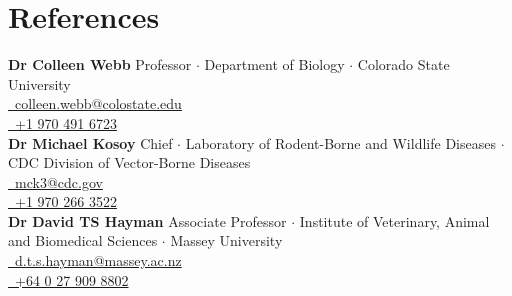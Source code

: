 \documentclass[letterpaper]{deedy-resume} %
\begin{document}

\section{References}
\textbf{Dr Colleen Webb} Professor $\cdot$ Department of Biology $\cdot$ Colorado State University\\
\href{mailto:colleen.webb@colostate.edu}{\Letter~colleen.webb@colostate.edu}\\
\href{tel:+19704916723}{\Mobilefone~+1 970 491 6723}\\

\sectionspace
\textbf{Dr Michael Kosoy} Chief $\cdot$ Laboratory of Rodent-Borne and Wildlife Diseases $\cdot$ CDC Division of Vector-Borne Diseases\\
\href{mailto:mck3@cdc.gov}{\Letter~mck3@cdc.gov}\\
\href{tel:+19702663522}{\Mobilefone~+1 970 266 3522}\\

\sectionspace
\textbf{Dr David TS Hayman} Associate Professor $\cdot$ Institute of Veterinary, Animal and Biomedical Sciences $\cdot$ Massey University\\
\href{mailto:d.t.s.hayman@massey.ac.nz}{\Letter~d.t.s.hayman@massey.ac.nz}\\
\href{tel:+640279098802}{\Mobilefone~+64 0 27 909 8802}\\
\end{document}
